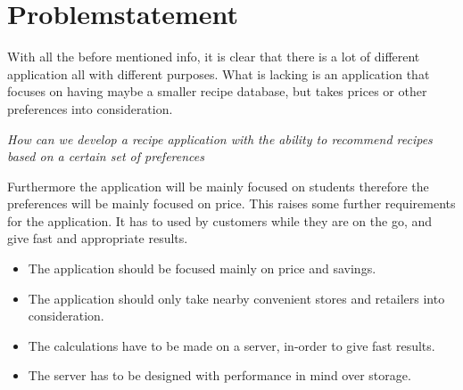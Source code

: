 \section{Problemstatement}
\label{sec:probstate}

With all the before mentioned info, it is clear that there is a lot of different application all with different purposes. What is lacking is an application that focuses on having maybe a smaller recipe database, but takes prices or other preferences into consideration.

\emph{How can we develop a recipe application with the ability to recommend recipes based on a certain set of preferences}

Furthermore the application will be mainly focused on students therefore the preferences will be mainly focused on price. This raises some further requirements for the application. It has to used by customers while they are on the go, and give fast and appropriate results.

\begin{itemize}
\item The application should be focused mainly on price and savings.
\item The application should only take nearby convenient stores and retailers into consideration.
\item The calculations have to be made on a server, in-order to give fast results.
\item The server has to be designed with performance in mind over storage.
\end{itemize}




